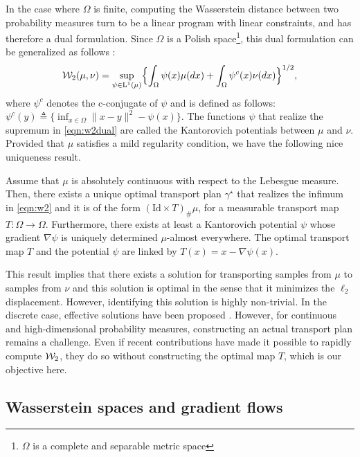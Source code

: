 In the case where $\Omega$ is finite, computing the Wasserstein distance between two probability measures turn to be  a linear program with linear constraints, and has therefore a dual formulation. Since $\Omega$ is a Polish space\footnote{$\Omega$ is a complete and separable metric space}, this dual formulation can be generalized as follows \cite[Theorem 5.10]{villani2008optimal}:
\begin{align}
{\cal W}_2(\mu,\nu) = \sup_{\psi \in \mathrm{L}^1(\mu)} \Bigl\{ \int_\Omega \psi(x) \mu(dx) + \int_\Omega \psi^c(x) \nu(dx) \Bigr\}^{1/2}, \label{eqn:w2dual}
\end{align}
where $\psi^c$ denotes the c-conjugate of $\psi$ and is defined as follows: $\psi^c(y) \triangleq \{ \inf_{x\in \Omega} \| x-y\|^2 - \psi(x)\}$. The functions $\psi$ that realize the supremum in \eqref{eqn:w2dual} are called the Kantorovich potentials between $\mu$ and $\nu$.
%
Provided that $\mu$ satisfies a mild regularity condition, we have the following nice uniqueness result.
\begin{thm}
\label{thm:unqmap}
Assume that  $\mu$ is absolutely continuous with respect to the Lebesgue measure. Then, there exists a unique optimal transport plan $\gamma^\star$ that realizes the infimum in \eqref{eqn:w2} and it is of the form $(\text{Id} \times T)_\# \mu$, for a measurable transport map $T : \Omega \to \Omega$. Furthermore, there exists at least a Kantorovich potential $\psi$ whose gradient $\nabla \psi$ is uniquely determined $\mu$-almost everywhere. The optimal transport map $T$ and the potential $\psi$ are linked by $T(x) = x- \nabla \psi(x)$.
\end{thm}


This result implies that there exists a solution for transporting samples from $\mu$ to samples from $\nu$ and this solution is optimal in the sense that it minimizes the $\ell_2$ displacement. However, identifying this solution is highly non-trivial. In the discrete case, effective solutions have been proposed \cite{cuturi2013sinkhorn}. However, for continuous and high-dimensional probability measures, constructing an actual transport plan remains a challenge. Even if recent contributions \cite{genevay2016stochastic} have made it possible to rapidly compute ${\cal W}_2$, they do so without constructing the optimal map $T$, which is our objective here.


\subsection{Wasserstein spaces and gradient flows}


